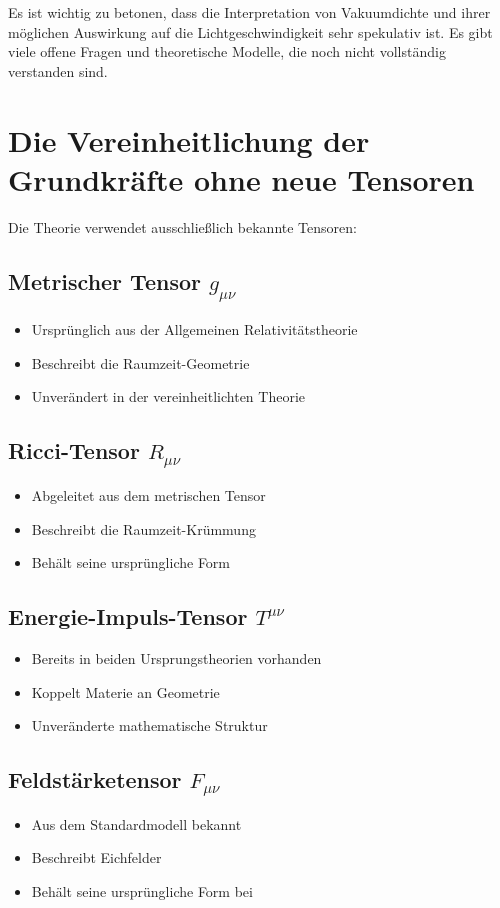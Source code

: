 \documentclass{article}
\begin{document}
	Es ist wichtig zu betonen, dass die Interpretation von Vakuumdichte und ihrer möglichen Auswirkung auf die Lichtgeschwindigkeit sehr spekulativ ist. Es gibt viele offene Fragen und theoretische Modelle, die noch nicht vollständig verstanden sind.
	

	
	\section{Die Vereinheitlichung der Grundkräfte ohne neue Tensoren}
	Die Theorie verwendet ausschließlich bekannte Tensoren:
	
	\subsection{Metrischer Tensor $g_{\mu\nu}$}
	\begin{itemize}
		\item Ursprünglich aus der Allgemeinen Relativitätstheorie
		\item Beschreibt die Raumzeit-Geometrie
		\item Unverändert in der vereinheitlichten Theorie
	\end{itemize}
	
	\subsection{Ricci-Tensor $R_{\mu\nu}$}
	\begin{itemize}
		\item Abgeleitet aus dem metrischen Tensor
		\item Beschreibt die Raumzeit-Krümmung
		\item Behält seine ursprüngliche Form
	\end{itemize}
	
	\subsection{Energie-Impuls-Tensor $T^{\mu\nu}$}
	\begin{itemize}
		\item Bereits in beiden Ursprungstheorien vorhanden
		\item Koppelt Materie an Geometrie
		\item Unveränderte mathematische Struktur
	\end{itemize}
	
	\subsection{Feldstärketensor $F_{\mu\nu}$}
	\begin{itemize}
		\item Aus dem Standardmodell bekannt
		\item Beschreibt Eichfelder
		\item Behält seine ursprüngliche Form bei
	\end{itemize}
	
\end{document}
